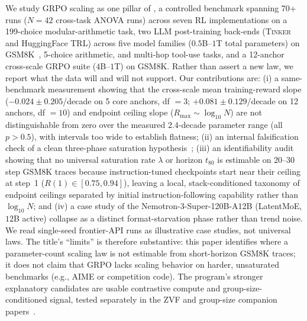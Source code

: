 We study GRPO scaling as one pillar of \ours{}, a controlled benchmark spanning 70+ runs
($N=42$ cross-task ANOVA runs) across seven RL implementations on a 199-choice modular-arithmetic task,
two LLM post-training back-ends (\textsc{Tinker} and HuggingFace \textsc{TRL}) across five model families ($0.5$B--$1$T total parameters)
on GSM8K~\citep{cobbe2021training}, 5-choice arithmetic, and multi-hop tool-use tasks, and a 12-anchor cross-scale GRPO suite ($4$B--$1$T) on GSM8K.
Rather than assert a new law, we report what the data will and will not
support. Our contributions are: (i) a same-benchmark measurement showing that the
cross-scale mean training-reward slope ($-0.024 \pm 0.205$/decade on 5 core anchors, df $=3$; $+0.081 \pm 0.129$/decade on 12 anchors, df $=10$) and endpoint ceiling slope ($R_{\max} \sim \log_{10} N$) are not distinguishable from zero
over the measured $2.4$-decade parameter range (all $p > 0.5$), with intervals too wide to establish flatness; (ii) an internal falsification check of a clean
three-phase saturation hypothesis~\citep{nimmaturi2025predictive}; (iii) an identifiability audit showing that no
universal saturation rate $\lambda$ or horizon $t_{80}$ is estimable on 20--30 step GSM8K traces because instruction-tuned checkpoints start near their ceiling at step~1 ($R(1) \in [0.75, 0.94]$), leaving a local, stack-conditioned taxonomy of endpoint ceilings separated by initial instruction-following capability rather than $\log_{10} N$; and (iv) a case study of the Nemotron-3-Super-120B-A12B (LatentMoE, $12$B active) collapse as a
distinct format-starvation phase rather than trend noise. We read single-seed frontier-API runs as
illustrative case studies, not universal laws. The title's ``limits'' is therefore
substantive: this paper identifies where a parameter-count scaling law is not
estimable from short-horizon GSM8K traces; it does not claim that GRPO lacks scaling behavior on harder, unsaturated benchmarks (e.g., AIME or competition code). The program's stronger explanatory candidates are usable
contrastive compute and group-size-conditioned signal, tested separately in the
ZVF and group-size companion papers~\citep{zvfaudit2026}.

